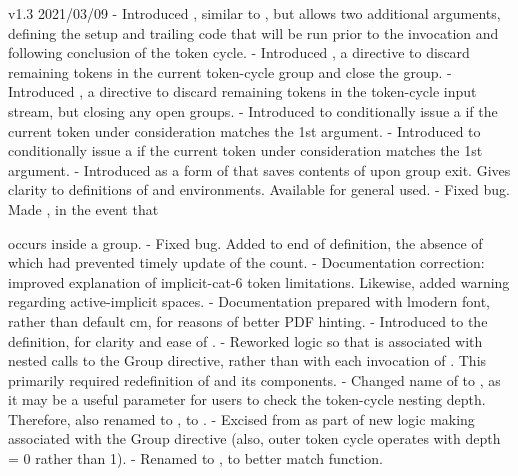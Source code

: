 v1.3  2021/03/09
      - Introduced \xtokcycleenvironment, similar to \tokcycleenvironment, but
        allows two additional arguments, defining the setup and trailing code
        that will be run prior to the invocation and following conclusion of the 
        token cycle.
      - Introduced \truncategroup, a directive to discard remaining tokens in the
        current token-cycle group and close the group.
      - Introduced \truncatecycle, a directive to discard remaining tokens in the
        token-cycle input stream, but closing any open groups.
      - Introduced \truncategroupiftokis{}{} to conditionally issue a \truncategroup
        if the current token under consideration matches the 1st argument.
      - Introduced \truncatecycleiftokis{}{} to conditionally issue a \truncatecycle
        if the current token under consideration matches the 1st argument.
      - Introduced \tcendgroup as a form of \endgroup that saves contents of
        \cytoks upon group exit.  Gives clarity to definitions of \tokencycle
        and \tokencyclexpress environments.  Available for general used.
      - Fixed bug.  Made \@@grpT \long, in the event that \par occurs inside a 
        group.
      - Fixed bug.  Added \relax to end of \add@tcdepth definition, the absence
        of which had prevented timely update of the \tcdepth count.
      - Documentation correction: improved explanation of implicit-cat-6 token
        limitations.  Likewise, added warning regarding active-implicit spaces.
      - Documentation prepared with lmodern font, rather than default cm,
        for reasons of better PDF hinting.
      - Introduced \exit@grouped to the \groupedcytoks definition, for clarity and
        ease of \expandafter.
      - Reworked logic so that \tcdepth is associated with nested calls to the 
        Group directive, rather than with each invocation of \processtoks.
        This primarily required redefinition of \@@grpT and its components.
      - Changed name of \tc@depth to \tcdepth, as it may be a useful parameter for
        users to check the token-cycle nesting depth.  Therefore, also renamed 
        \subtc@depth to \sub@tcdepth, \addtc@depth to \add@tcdepth.
      - Excised \sub@tcdepth from \endtokcycraw as part of new logic making
        \tcdepth associated with the Group directive (also, outer token cycle 
        operates with depth = 0 rather than 1).
      - Renamed \@defgroupedcytoks to , to better match function.
